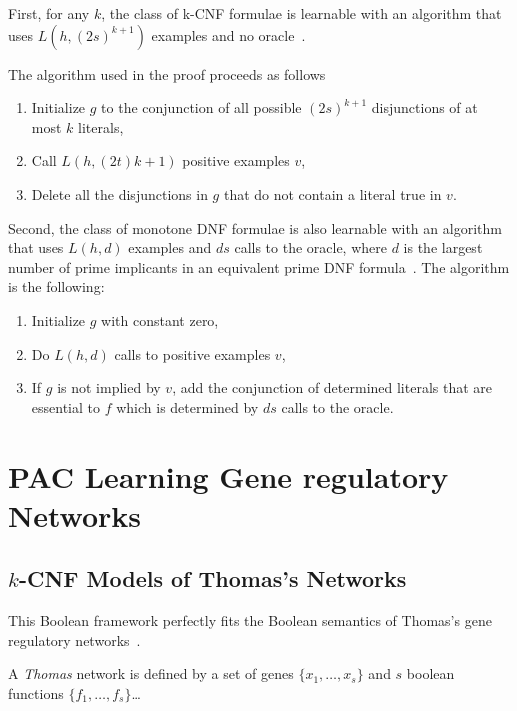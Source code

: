 \documentclass{llncs}
\begin{document}
\begin{theorem}\label{thm:kcnf}
First, for any $k$, the class of k-CNF formulae is learnable with an
algorithm that uses $L(h,(2s)^{k+1})$ examples and no oracle~\cite{Valiant84cacm}.
\end{theorem}

The algorithm used in the proof proceeds as follows
\begin{enumerate}
  \item Initialize $g$ to the conjunction of all possible $(2s)^{k+1}$ disjunctions of at most $k$ literals,
\item Call $L(h,(2t)k+1)$ positive examples $v$,
\item Delete all the disjunctions in $g$ that do not contain a literal true in $v$.
\end{enumerate}


    Second, the class of monotone DNF formulae is also learnable with an algorithm that uses $L(h,d)$ examples and $ds$ calls to the oracle,
    where $d$ is the largest number of prime implicants in an equivalent prime DNF formula~\cite{Valiant84cacm}.
The algorithm is the following:
\begin{enumerate}
\item Initialize $g$ with constant zero,
\item
Do $L(h,d)$ calls to positive examples $v$,
\item
If $g$ is not implied by $v$, add the conjunction of determined literals that are essential to $f$ which is determined by $ds$ calls to the oracle.
\end{enumerate}

\section{PAC Learning Gene regulatory Networks}

\subsection{$k$-CNF Models of Thomas's Networks}

This Boolean framework perfectly fits the Boolean semantics of Thomas's gene
regulatory networks~\cite{GK73jtb,Thomas73jtb,TA90book}.


\begin{definition}
   A \emph{Thomas} network is defined by a set of genes $\{x_1,\dots,x_s\}$
   and $s$ boolean functions $\{f_1,\dots,f_s\}$\dots
\end{definition}
\end{document}
